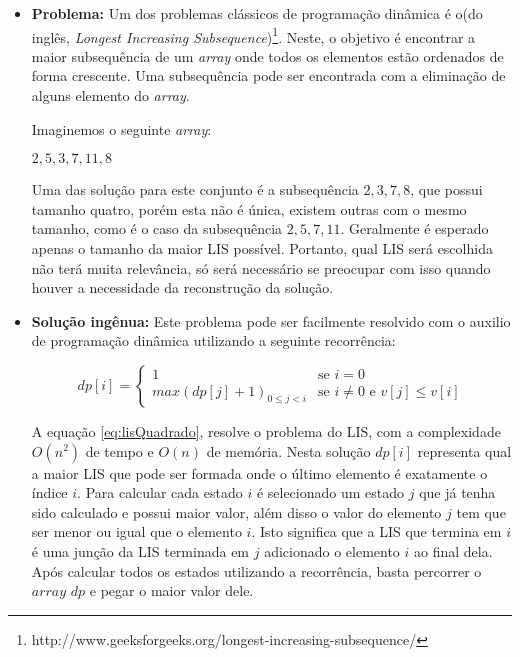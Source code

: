 \begin{itemize}
 \item \textbf{Problema:} Um dos problemas clássicos de programação dinâmica é o(do inglês, \textit{Longest Increasing Subsequence})\footnote{http://www.geeksforgeeks.org/longest-increasing-subsequence/}. Neste, o objetivo é encontrar a maior subsequência de um \textit{array} onde todos os elementos estão ordenados de forma crescente. Uma subsequência pode ser encontrada com a eliminação de alguns elemento do \textit{array}.

Imaginemos o seguinte \textit{array}:

\begin{center}
	${2, 5, 3, 7, 11, 8}$
\end{center}

Uma das solução para este conjunto é a subsequência ${2, 3, 7, 8}$, que possui tamanho quatro, porém esta não é única, existem outras com o mesmo tamanho, como é o caso da subsequência ${2, 5, 7, 11}$. Geralmente é esperado apenas o tamanho da maior LIS possível. Portanto, qual LIS será escolhida não terá muita relevância, só será necessário se preocupar com isso quando houver a necessidade da reconstrução da solução.

\item \textbf{Solução ingênua:} Este problema pode ser facilmente resolvido com o auxilio de programação dinâmica utilizando a seguinte recorrência:

\begin{equation}
dp[i] = 
\begin{cases}
1 &\text{se } i = 0 \\
max(dp[j] + 1)_{0 \leq j < i} &\text{se } i \neq 0 \text{ e } v[j] \leq v[i]

\end{cases}
\label{eq:lisQuadrado}
\end{equation}

A equação \ref{eq:lisQuadrado}, resolve o problema do LIS, com a complexidade $O(n^2)$ de tempo e $O(n)$ de memória. Nesta solução $dp[i]$ representa qual a maior LIS que pode ser formada onde o último elemento é exatamente o índice $i$. Para calcular cada estado $i$ é selecionado um estado $j$ que já tenha sido calculado e possui maior valor, além disso o valor do elemento $j$ tem que ser menor ou igual que o elemento $i$. Isto significa que a LIS que termina em $i$ é uma junção da LIS terminada em $j$ adicionado o elemento $i$ ao final dela. Após calcular todos os estados utilizando a recorrência, basta percorrer o $array$ $dp$ e pegar o maior valor dele.


\end{itemize}
